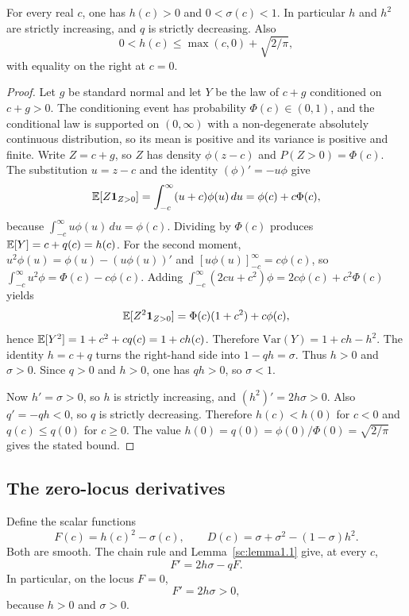 \begin{lemma}\label{sc:lemma1.2}
For every real \(c\), one has \(h(c)>0\) and \(0<\sigma(c)<1\). In particular \(h\) and \(h^2\) are strictly increasing, and \(q\) is strictly decreasing. Also
\[
0<h(c)\le \max(c,0)+\sqrt{2/\pi},
\]
with equality on the right at \(c=0\).

\end{lemma}
\begin{proof}
Let \(g\) be standard normal and let \(Y\) be the law of \(c+g\) conditioned on \(c+g>0\). The conditioning event has probability \(\Phi(c)\in(0,1)\), and the conditional law is supported on \((0,\infty)\) with a non-degenerate absolutely continuous distribution, so its mean is positive and its variance is positive and finite. Write \(Z=c+g\), so \(Z\) has density \(\phi(z-c)\) and \(P(Z>0)=\Phi(c)\). The substitution \(u=z-c\) and the identity \((\phi)'=-u\phi\) give
\[
\mathbb E[Z\mathbf 1_{Z>0}]=\int_{-c}^{\infty}(u+c)\phi(u)\,du=\phi(c)+c\Phi(c),
\]
because \(\int_{-c}^{\infty}u\phi(u)\,du=\phi(c)\). Dividing by \(\Phi(c)\) produces \(\mathbb E[Y]=c+q(c)=h(c)\). For the second moment, \(u^2\phi(u)=\phi(u)-(u\phi(u))'\) and \([u\phi(u)]_{-c}^{\infty}=c\phi(c)\), so \(\int_{-c}^{\infty}u^2\phi=\Phi(c)-c\phi(c)\). Adding \(\int_{-c}^{\infty}(2cu+c^2)\phi=2c\phi(c)+c^2\Phi(c)\) yields
\[
\mathbb E[Z^2\mathbf 1_{Z>0}]=\Phi(c)(1+c^2)+c\phi(c),
\]
hence \(\mathbb E[Y^2]=1+c^2+cq(c)=1+ch(c)\). Therefore \(\mathrm{Var}(Y)=1+ch-h^2\). The identity \(h=c+q\) turns the right-hand side into \(1-qh=\sigma\). Thus \(h>0\) and \(\sigma>0\). Since \(q>0\) and \(h>0\), one has \(qh>0\), so \(\sigma<1\).

Now \(h'=\sigma>0\), so \(h\) is strictly increasing, and \((h^2)'=2h\sigma>0\). Also \(q'=-qh<0\), so \(q\) is strictly decreasing. Therefore \(h(c)<h(0)\) for \(c<0\) and \(q(c)\le q(0)\) for \(c\ge 0\). The value \(h(0)=q(0)=\phi(0)/\Phi(0)=\sqrt{2/\pi}\) gives the stated bound.

\end{proof}

\subsection{The zero-locus derivatives}\label{sc:sub2}

Define the scalar functions
\[
F(c)=h(c)^2-\sigma(c),\qquad D(c)=\sigma+\sigma^2-(1-\sigma)h^2.
\]
Both are smooth. The chain rule and Lemma~\ref{sc:lemma1.1} give, at every \(c\),
\[
F'=2h\sigma-q F.
\]
In particular, on the locus \(F=0\),
\[
F'=2h\sigma>0,
\]
because \(h>0\) and \(\sigma>0\).

